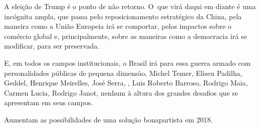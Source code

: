 A eleição de Trump é o ponto de não retorno. O~que virá daqui em diante
é uma incógnita ampla, que passa pelo reposicionamento estratégico da
China, pela maneira como a União Europeia irá se comportar, pelos
impactos sobre o comércio global e, principalmente, sobre as maneiras
como a democracia irá se modificar, para ser preservada.~

E, em todos os campos institucionais, o Brasil irá para essa guerra
armado com personalidades públicas de pequena dimensão, Michel Temer,
Eliseu Padilha, Geddel, Henrique Meirelles, José Serra, , Luis
Roberto Barroso, Rodrigo Maia, Carmen Lucia, Rodrigo Janot, nenhum à
altura dos grandes desafios que se apresentam em seus campos.

Aumentam as possibilidades de uma solução bonapartista em 2018.
